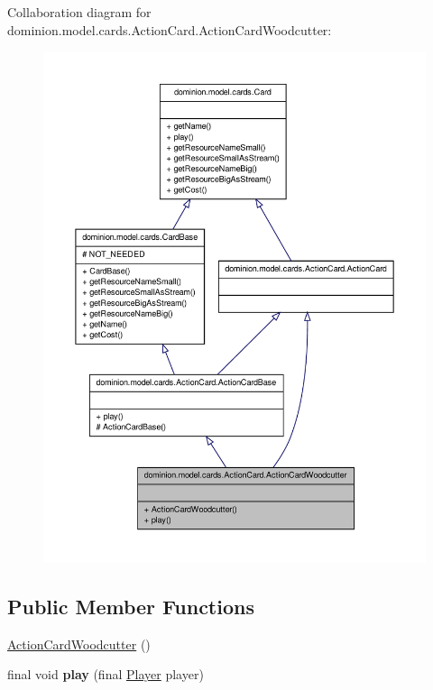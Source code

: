 \-Collaboration diagram for dominion.\-model.\-cards.\-Action\-Card.\-Action\-Card\-Woodcutter\-:
\nopagebreak
\begin{figure}[H]
\begin{center}
\leavevmode
\includegraphics[width=350pt]{classdominion_1_1model_1_1cards_1_1ActionCard_1_1ActionCardWoodcutter__coll__graph}
\end{center}
\end{figure}
\subsection*{\-Public \-Member \-Functions}
\begin{DoxyCompactItemize}
\item 
\hyperlink{classdominion_1_1model_1_1cards_1_1ActionCard_1_1ActionCardWoodcutter_a5440fe67d41dcca93222a8d2f2f0e403}{\-Action\-Card\-Woodcutter} ()
\item 
\hypertarget{classdominion_1_1model_1_1cards_1_1ActionCard_1_1ActionCardWoodcutter_ac06a5b327b46b7a5e0a928763d10c375}{final void {\bfseries play} (final \hyperlink{interfacedominion_1_1model_1_1Player}{\-Player} player)}\label{classdominion_1_1model_1_1cards_1_1ActionCard_1_1ActionCardWoodcutter_ac06a5b327b46b7a5e0a928763d10c375}

\end{DoxyCompactItemize}


